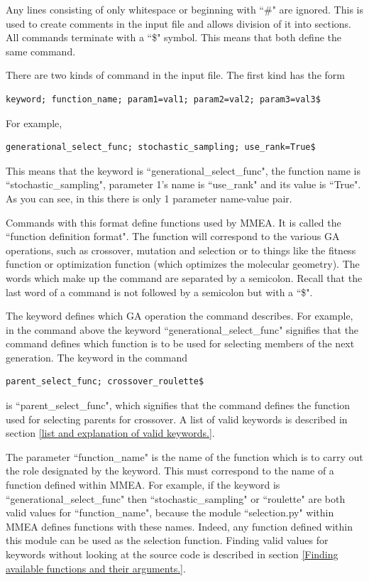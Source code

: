 \documentclass[12pt]{article}
\begin{document}
Any lines consisting of only whitespace or beginning with ``\#" are ignored. This is used to create comments in the input file and allows division of it into sections. All commands terminate with a ``\$" symbol. This means that both define the same command. 

There are two kinds of command in the input file. The first kind has the form
\begin{verbatim}
keyword; function_name; param1=val1; param2=val2; param3=val3$
\end{verbatim}
For example, 
\begin{verbatim}
generational_select_func; stochastic_sampling; use_rank=True$
\end{verbatim}
This means that the keyword is ``generational\_select\_func", the function name is ``stochastic\_sampling", parameter 1's name is ``use\_rank" and its value is ``True". As you can see, in this there is only 1 parameter name-value pair.

Commands with this format define functions used by MMEA. It is called the ``function definition format". The function will correspond to the various GA operations, such as crossover, mutation and selection or to things like the fitness function or optimization function (which optimizes the molecular geometry). The words which make up the command are separated by a semicolon. Recall that the last word of a command is not followed by a semicolon but with a ``\$". 

The keyword defines which GA operation the command describes. For example, in the command above the keyword ``generational\_select\_func" signifies that the command defines which function is to be used for selecting members of the next generation. The keyword in the command
\begin{verbatim}
parent_select_func; crossover_roulette$
\end{verbatim} 
is ``parent\_select\_func", which signifies that the command defines the function used for selecting parents for crossover. A list of valid keywords is described in section \ref{list and explanation of valid keywords.}.

The parameter ``function\_name" is the name of the function which is to carry out the role designated by the keyword. This must correspond to the name of a function defined within MMEA. For example, if the keyword is ``generational\_select\_func" then ``stochastic\_sampling" or ``roulette" are both valid values for ``function\_name", because the module ``selection.py" within MMEA defines functions with these names. Indeed, any function defined within this module can be used as the selection function. Finding valid values for keywords without looking at the source code is described in section \ref{Finding available functions and their arguments.}.
\end{document}
